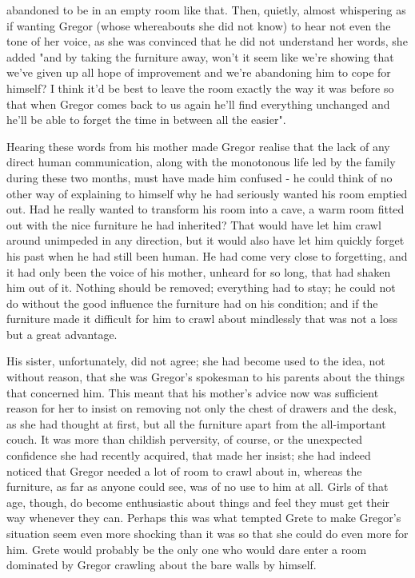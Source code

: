 abandoned to be in an empty room like that. Then, quietly, almost whispering as if wanting Gregor (whose whereabouts she did not know) to hear not even the tone of her voice, as she was convinced that he did not understand her words, she added "and by taking the furniture away, won't it seem like we're showing that we've given up all hope of improvement and we're abandoning him to cope for himself? I think it'd be best to leave the room exactly the way it was before so that when Gregor comes back to us again he'll find everything unchanged and he'll be able to forget the time in between all the easier".

Hearing these words from his mother made Gregor realise that the lack of any direct human communication, along with the monotonous life led by the family during these two months, must have made him confused - he could think of no other way of explaining to himself why he had seriously wanted his room emptied out. Had he really wanted to transform his room into a cave, a warm room fitted out with the nice furniture he had inherited? That would have let him crawl around unimpeded in any direction, but it would also have let him quickly forget his past when he had still been human. He had come very close to forgetting, and it had only been the voice of his mother, unheard for so long, that had shaken him out of it. Nothing should be removed; everything had to stay; he could not do without the good influence the furniture had on his condition; and if the furniture made it difficult for him to crawl about mindlessly that was not a loss but a great advantage.

His sister, unfortunately, did not agree; she had become used to the idea, not without reason, that she was Gregor's spokesman to his parents about the things that concerned him. This meant that his mother's advice now was sufficient reason for her to insist on removing not only the chest of drawers and the desk, as she had thought at first, but all the furniture apart from the all-important couch. It was more than childish perversity, of course, or the unexpected confidence she had recently acquired, that made her insist; she had indeed noticed that Gregor needed a lot of room to crawl about in, whereas the furniture, as far as anyone could see, was of no use to him at all. Girls of that age, though, do become enthusiastic about things and feel they must get their way whenever they can. Perhaps this was what tempted Grete to make Gregor's situation seem even more shocking than it was so that she could do even more for him. Grete would probably be the only one who would dare enter a room dominated by Gregor crawling about the bare walls by himself.

